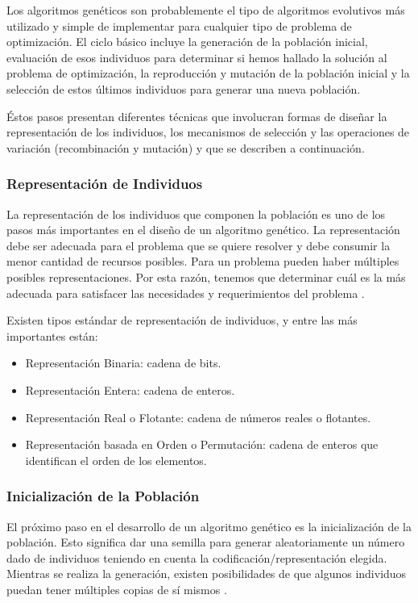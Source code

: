 Los algoritmos genéticos son probablemente el tipo de algoritmos evolutivos más utilizado y simple de implementar para cualquier tipo de problema de optimización.
El ciclo básico incluye la generación de la población inicial, evaluación de esos individuos para determinar si hemos hallado la solución al problema de optimización, la reproducción y mutación de la población  inicial y la selección de estos últimos  individuos para generar una nueva población. 

Éstos pasos presentan diferentes técnicas que involucran formas de  diseñar la representación de los individuos, los mecanismos de selección y las operaciones de variación (recombinación y mutación) \cite{grosan2011intelligent} y que se describen a continuación.

\subsubsection{Representación de Individuos}
La representación de los individuos que componen la población es uno de los pasos más importantes en el diseño de un algoritmo genético. La representación debe ser adecuada para el problema que se quiere resolver y debe consumir la menor cantidad de recursos posibles. Para un problema pueden haber múltiples posibles representaciones. Por esta razón, tenemos que determinar cuál es la más adecuada para satisfacer las necesidades y requerimientos del problema \cite{grosan2011intelligent}.

Existen tipos estándar de representación de individuos, y entre las más importantes están: %
\begin{itemize}
    \item Representación Binaria: cadena de bits.
    \item Representación Entera: cadena de enteros.
    \item Representación Real o Flotante: cadena de números reales o flotantes.
    \item Representación basada en Orden o Permutación: cadena de enteros que identifican el orden de los elementos.
\end{itemize}

\subsubsection{Inicialización de la Población}
El próximo paso en el desarrollo de un algoritmo genético es la inicialización de la población. Esto significa dar una semilla para generar aleatoriamente un número dado de individuos teniendo en cuenta la codificación/representación elegida. Mientras se realiza la generación, existen posibilidades de que algunos individuos puedan tener múltiples copias de sí mismos \cite{grosan2011intelligent}.

